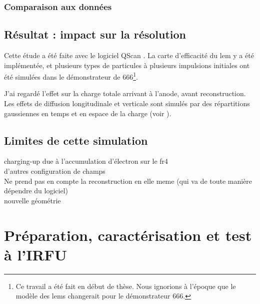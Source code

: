             \subsubsection{Comparaison aux données}
            
            
        \subsection{Résultat : impact sur la résolution}
        
            Cette étude a été faite avec le logiciel QScan \cite{qscan}. La carte d'efficacité du \gls{lem} y a été implémentée, et plusieurs types de particules à plusieurs impulsions initiales ont été simulées dans le démonstrateur de 666\footnote{Ce travail a été fait en début de thèse. Nous ignorions à l'époque que le modèle des \glspl{lem} changerait pour le démonstrateur 666.}.
            
            J'ai regardé l'effet sur la charge totale arrivant à l'anode, avant reconstruction. Les effets de diffusion longitudinale et verticale sont simulés par des répartitions gaussiennes en temps et en espace de la charge (voir \cite{diffusion}).
            
        
        \subsection{Limites de cette simulation}
            charging-up due à l'accumulation d'électron sur le \gls{fr4}\\
            d'autres configuration de champs\\
            Ne prend pas en compte la reconstruction en elle meme (qui va de toute manière dépendre du logiciel)\\
            nouvelle géométrie
        
    \section{Préparation, caractérisation et test à l'IRFU}
    
